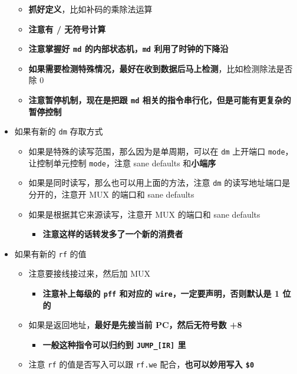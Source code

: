 \documentclass[12pt,AutoFakeBold,AutoFakeSlant]{article}
\providecommand{\tightlist}{%
  \setlength{\itemsep}{0pt}\setlength{\parskip}{0pt}}
\begin{document}
\begin{itemize}
  \begin{itemize}
  \tightlist
  \item
    \textbf{抓好定义}，比如补码的乘除法运算
  \item
    \textbf{注意有 / 无符号计算}
  \item
    \textbf{注意掌握好 \texttt{md} 的内部状态机，\texttt{md}
    利用了时钟的下降沿}
  \item
    \textbf{如果需要检测特殊情况，最好在收到数据后马上检测}，比如检测除法是否除
    0
  \item
    \textbf{注意暂停机制，现在是把跟 \texttt{md}
    相关的指令串行化，但是可能有更复杂的暂停控制}
  \end{itemize}
\item
  如果有新的 \texttt{dm} 存取方式

  \begin{itemize}
  \tightlist
  \item
    如果是特殊的读写范围，那么因为是单周期，可以在 \texttt{dm} 上开端口
    \texttt{mode}，让控制单元控制 \texttt{mode}，注意 sane defaults
    和\textbf{小端序}
  \item
    如果是同时读写，那么也可以用上面的方法，注意 \texttt{dm}
    的读写地址端口是分开的，注意开 MUX 的端口和 sane defaults
  \item
    如果是根据其它来源读写，注意开 MUX 的端口和 sane defaults

    \begin{itemize}
    \tightlist
    \item
      \textbf{注意这样的话转发多了一个新的消费者}
    \end{itemize}
  \end{itemize}
\item
  如果有新的 \texttt{rf} 的值

  \begin{itemize}
  \tightlist
  \item
    注意要接线接过来，然后加 MUX

    \begin{itemize}
    \tightlist
    \item
      \textbf{注意补上每级的 \texttt{pff} 和对应的
      \texttt{wire}，一定要声明，否则默认是 1 位的}
    \end{itemize}
  \item
    如果是返回地址，\textbf{最好是先接当前 PC，然后无符号数 +8}

    \begin{itemize}
    \tightlist
    \item
      \textbf{一般这种指令可以归约到 \texttt{JUMP\_{[}IR{]}} 里}
    \end{itemize}
  \item
    注意 \texttt{rf} 的值是否写入可以跟 \texttt{rf.we}
    配合，\textbf{也可以妙用写入 \texttt{\$0}}
  \end{itemize}
\end{itemize}
\end{document}
